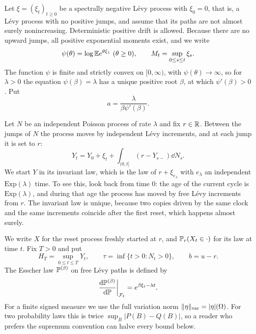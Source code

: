 \documentclass[11pt,a4paper]{article}
\begin{document}
Let $\xi=(\xi_t)_{t\ge0}$ be a spectrally negative L\'evy process with $\xi_0=0$, that is, a L\'evy process with no positive jumps, and assume that its paths are not almost surely nonincreasing. Deterministic positive drift is allowed. Because there are no upward jumps, all positive exponential moments exist, and we write
\[
 \psi(\theta)=\log\EE e^{\theta\xi_1}\ (\theta\ge0),\qquad M_t=\sup_{0\le s\le t}\xi_s .
\]
The function $\psi$ is finite and strictly convex on $[0,\infty)$, with $\psi(\theta)\to\infty$, so for $\lambda>0$ the equation $\psi(\beta)=\lambda$ has a unique positive root $\beta$, at which $\psi'(\beta)>0$. Put
\begin{equation}\label{eq:a}
 a=\frac{\lambda}{\beta\psi'(\beta)} .
\end{equation}

Let $N$ be an independent Poisson process of rate $\lambda$ and fix $r\in\mathbb R$. Between the jumps of $N$ the process moves by independent L\'evy increments, and at each jump it is set to $r$:
\begin{equation}\label{eq:sde}
 Y_t=Y_0+\xi_t+\int_{(0,t]}(r-Y_{s-})\dd N_s .
\end{equation}
We start $Y$ in its invariant law, which is the law of $r+\xi_{e_\lambda}$ with $e_\lambda$ an independent $\mathrm{Exp}(\lambda)$ time. To see this, look back from time $0$: the age of the current cycle is $\mathrm{Exp}(\lambda)$, and during that age the process has moved by free L\'evy increments from $r$. The invariant law is unique, because two copies driven by the same clock and the same increments coincide after the first reset, which happens almost surely.

We write $X$ for the reset process freshly started at $r$, and $\mathbb P_r(X_t\in\cdot)$ for its law at time $t$. Fix $T>0$ and put
\[
 H_T=\sup_{0\le t\le T}Y_t,\qquad \tau=\inf\{t>0:N_t>0\},\qquad b=u-r .
\]
The Esscher law $\mathbb P^{(\beta)}$ on free L\'evy paths is defined by
\begin{equation}\label{eq:esscher}
 \frac{\mathrm d\mathbb P^{(\beta)}}{\mathrm d\mathbb P}\bigg|_{\mathcal F_t}=e^{\beta\xi_t-\lambda t}.
\end{equation}
For a finite signed measure we use the full variation norm $\|\eta\|_{\mathrm{var}}=|\eta|(\Omega)$. For two probability laws this is twice $\sup_B|P(B)-Q(B)|$, so a reader who prefers the supremum convention can halve every bound below.
\end{document}
